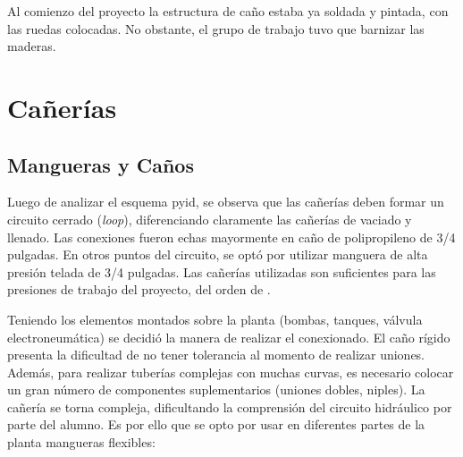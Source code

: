 Al comienzo del proyecto la estructura de caño estaba ya soldada y pintada, con
las ruedas colocadas.
No obstante, el grupo de trabajo tuvo que barnizar las maderas.

\section{Cañerías}
\label{sec:Canerias}

\subsection{Mangueras y Caños}
Luego de analizar el esquema \gls{pyid}, se observa que las cañerías deben
formar un circuito cerrado (\emph{loop}), diferenciando
claramente las cañerías de vaciado y llenado.
Las conexiones fueron echas mayormente en caño de polipropileno de 3/4
pulgadas.
En otros puntos del circuito, se optó por utilizar manguera de alta presión
telada de 3/4 pulgadas.
Las cañerías utilizadas son suficientes para las presiones de trabajo del
proyecto, del orden de .

Teniendo los elementos montados sobre la planta (bombas, tanques, válvula
electroneumática) se decidió la manera de realizar el conexionado.
El caño rígido presenta la dificultad de no tener tolerancia al momento de
realizar uniones.
Además, para realizar tuberías complejas con muchas curvas, es necesario
colocar un gran número de componentes suplementarios (uniones dobles,
niples).
La cañería se torna compleja, dificultando la comprensión del circuito
hidráulico por parte del alumno.
Es por ello que se opto por usar en diferentes partes de la planta mangueras
flexibles:


